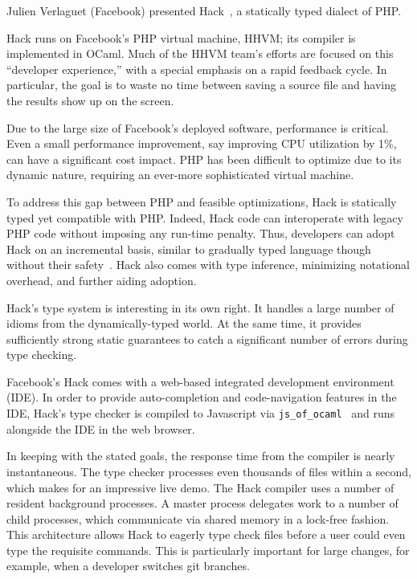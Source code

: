 \documentclass{jfp1}
\begin{document}

Julien Verlaguet (Facebook) presented Hack~\cite{Verlaguet:2014:Hack}, a
statically typed dialect of PHP.

Hack runs on Facebook's PHP virtual machine, HHVM; its compiler is
implemented in OCaml. Much of the HHVM team's efforts are focused on
this ``developer experience,'' with a special emphasis on a rapid
feedback cycle. In particular, the goal is to waste no time between
saving a source file and having the results show up on the screen.

Due to the large size of Facebook's deployed software, performance is
critical.  Even a small performance improvement, say improving CPU
utilization by 1\%, can have a significant cost impact. PHP has been
difficult to optimize due to its dynamic nature, requiring an
ever-more sophisticated virtual machine.

To address this gap between PHP and feasible optimizations, Hack is
statically typed yet compatible with PHP. Indeed, Hack code can
interoperate with legacy PHP code without imposing any run-time
penalty. Thus, developers can adopt Hack on an incremental
basis, similar to gradually typed language though without their
safety~\cite{st:gradual06,thf:dls06}. Hack also comes with type
inference, minimizing notational overhead, and further aiding
adoption.

Hack's type system is interesting in its own right. It handles a large
number of idioms from the dynamically-typed world. At the same time,
it provides sufficiently strong static guarantees to catch a
significant number of errors during type checking.

Facebook's Hack comes with a web-based integrated development environment
(IDE). In order to provide auto-completion and code-navigation features in
the IDE, Hack's type checker is compiled to Javascript via
\texttt{js\_of\_ocaml}~\cite{DBLP:journals/spe/VouillonB14} and runs
alongside the IDE in the web browser.

In keeping with the stated goals, the response time from the compiler is
nearly instantaneous. The type checker processes even thousands of files
within a second, which makes for an impressive live demo.  The Hack
compiler uses a number of resident background processes. A master process
delegates work to a number of child processes, which communicate via
shared memory in a lock-free fashion. This architecture allows Hack to
eagerly type check files before a user could even type the requisite
commands. This is particularly important for large changes, for example,
when a developer switches git branches.
\end{document}
